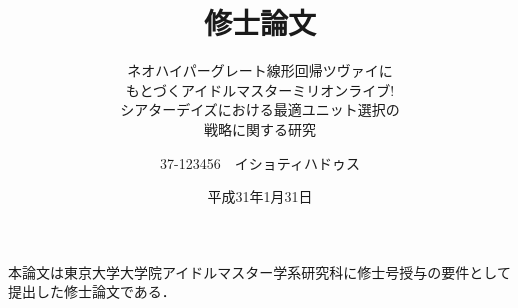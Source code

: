 \documentclass[10pt,a4j,fleqn,dvipdfmx,uplatex]{jsarticle}
\title{修士論文}
\subtitle{ネオハイパーグレート線形回帰ツヴァイに\\もとづくアイドルマスターミリオンライブ!\\シアターデイズにおける最適ユニット選択の\\戦略に関する研究}
\author{37-123456　イショティハドゥス}
\date{平成31年1月31日}
\begin{document}
\maketitle

\vspace*{30zh}
\begin{center}
本論文は東京大学大学院アイドルマスター学系研究科に修士号授与の要件として提出した修士論文である．
\end{center}

\newpage
\pagestyle{plain}
\setcounter{page}{1}


\tableofcontents

\listoffigures
\listoftables

\newpage
{}
\setcounter{page}{1}








\appendix

\end{document}
